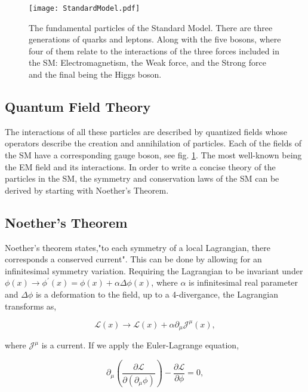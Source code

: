 \begin{figure}
 	\centering
	\texttt{[image: StandardModel.pdf]}
 	\caption{The fundamental particles of the Standard Model. There are three generations of quarks and leptons. Along with the five bosons, where four of them relate to the interactions of the three forces included in the SM: Electromagnetism, the Weak force, and the Strong force and the final being the Higgs boson. }
 	\label{SMParticles} 
\end{figure}
 
 \subsection{Quantum Field Theory}
 \label{QFT}
 
 The interactions of all these particles are described by quantized fields whose operators describe the creation and annihilation of particles. Each of the fields of the SM have a corresponding gauge boson, see fig. \ref{SMParticles}. The most well-known being the EM field and its interactions. In order to write a concise theory of the particles in the SM, the symmetry and conservation laws of the SM can be derived by starting with Noether's Theorem.
 
 \subsection{Noether's Theorem}
 
 Noether's theorem states,"to each symmetry of a local Lagrangian, there corresponds a conserved current". This can be done by allowing for an infinitesimal symmetry variation. Requiring the Lagrangian to be invariant under $\phi(x)\rightarrow\phi^\prime(x)=\phi(x)+\alpha\Delta\phi(x)$, where $\alpha$ is infinitesimal real parameter and $\Delta\phi$ is a deformation to the field, up to a 4-divergance, the Lagrangian transforms as,
 
 \begin{equation}\label{LagrangeFluctuation}
 \mathcal{L}(x)\rightarrow\mathcal{L}(x)+\alpha\partial_\mu\mathcal{J}^\mu(x),
 \end{equation}
 
 where $\mathcal{J}^\mu$ is a current. If we apply the Euler-Lagrange equation,
 
 \begin{equation}
 \partial_\mu(\frac{\partial\mathcal{L}}{\partial(\partial_\mu\phi)})-\frac{\partial\mathcal{L}}{\partial\phi}=0,
 \end{equation}
 
